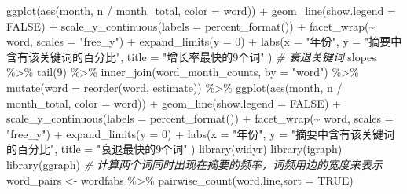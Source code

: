 \documentclass[]{tufte-book}
\newenvironment{Shaded}{}{}
\newcommand{\AttributeTok}[1]{\textcolor[rgb]{0.49,0.56,0.16}{#1}}
\newcommand{\CommentTok}[1]{\textcolor[rgb]{0.38,0.63,0.69}{\textit{#1}}}
\newcommand{\ConstantTok}[1]{\textcolor[rgb]{0.53,0.00,0.00}{#1}}
\newcommand{\DecValTok}[1]{\textcolor[rgb]{0.25,0.63,0.44}{#1}}
\newcommand{\FunctionTok}[1]{\textcolor[rgb]{0.02,0.16,0.49}{#1}}
\newcommand{\NormalTok}[1]{#1}
\newcommand{\OtherTok}[1]{\textcolor[rgb]{0.00,0.44,0.13}{#1}}
\newcommand{\SpecialCharTok}[1]{\textcolor[rgb]{0.25,0.44,0.63}{#1}}
\newcommand{\StringTok}[1]{\textcolor[rgb]{0.25,0.44,0.63}{#1}}
\begin{document}
\begin{Shaded}
\begin{Highlighting}[]
  \FunctionTok{ggplot}\NormalTok{(}\FunctionTok{aes}\NormalTok{(month, n }\SpecialCharTok{/}\NormalTok{ month\_total, }\AttributeTok{color =}\NormalTok{ word)) }\SpecialCharTok{+}
  \FunctionTok{geom\_line}\NormalTok{(}\AttributeTok{show.legend =} \ConstantTok{FALSE}\NormalTok{) }\SpecialCharTok{+}
  \FunctionTok{scale\_y\_continuous}\NormalTok{(}\AttributeTok{labels =} \FunctionTok{percent\_format}\NormalTok{()) }\SpecialCharTok{+}
  \FunctionTok{facet\_wrap}\NormalTok{(}\SpecialCharTok{\textasciitilde{}}\NormalTok{ word, }\AttributeTok{scales =} \StringTok{"free\_y"}\NormalTok{) }\SpecialCharTok{+}
  \FunctionTok{expand\_limits}\NormalTok{(}\AttributeTok{y =} \DecValTok{0}\NormalTok{) }\SpecialCharTok{+}
  \FunctionTok{labs}\NormalTok{(}\AttributeTok{x =} \StringTok{"年份"}\NormalTok{,}
       \AttributeTok{y =} \StringTok{"摘要中含有该关键词的百分比"}\NormalTok{,}
       \AttributeTok{title =} \StringTok{"增长率最快的9个词"}
\NormalTok{              )}
\CommentTok{\# 衰退关键词}
\NormalTok{slopes }\SpecialCharTok{\%\textgreater{}\%}
  \FunctionTok{tail}\NormalTok{(}\DecValTok{9}\NormalTok{) }\SpecialCharTok{\%\textgreater{}\%}
  \FunctionTok{inner\_join}\NormalTok{(word\_month\_counts, }\AttributeTok{by =} \StringTok{"word"}\NormalTok{) }\SpecialCharTok{\%\textgreater{}\%}
  \FunctionTok{mutate}\NormalTok{(}\AttributeTok{word =} \FunctionTok{reorder}\NormalTok{(word, estimate)) }\SpecialCharTok{\%\textgreater{}\%}
  \FunctionTok{ggplot}\NormalTok{(}\FunctionTok{aes}\NormalTok{(month, n }\SpecialCharTok{/}\NormalTok{ month\_total, }\AttributeTok{color =}\NormalTok{ word)) }\SpecialCharTok{+}
  \FunctionTok{geom\_line}\NormalTok{(}\AttributeTok{show.legend =} \ConstantTok{FALSE}\NormalTok{) }\SpecialCharTok{+}
  \FunctionTok{scale\_y\_continuous}\NormalTok{(}\AttributeTok{labels =} \FunctionTok{percent\_format}\NormalTok{()) }\SpecialCharTok{+}
  \FunctionTok{facet\_wrap}\NormalTok{(}\SpecialCharTok{\textasciitilde{}}\NormalTok{ word, }\AttributeTok{scales =} \StringTok{"free\_y"}\NormalTok{) }\SpecialCharTok{+}
  \FunctionTok{expand\_limits}\NormalTok{(}\AttributeTok{y =} \DecValTok{0}\NormalTok{) }\SpecialCharTok{+}
  \FunctionTok{labs}\NormalTok{(}\AttributeTok{x =} \StringTok{"年份"}\NormalTok{,}
       \AttributeTok{y =} \StringTok{"摘要中含有该关键词的百分比"}\NormalTok{,}
       \AttributeTok{title =} \StringTok{"衰退最快的9个词"}
\NormalTok{              )}
\FunctionTok{library}\NormalTok{(widyr)}
\FunctionTok{library}\NormalTok{(igraph)}
\FunctionTok{library}\NormalTok{(ggraph)}
\CommentTok{\# 计算两个词同时出现在摘要的频率，词频用边的宽度来表示}
\NormalTok{word\_pairs }\OtherTok{\textless{}{-}}\NormalTok{ wordfabs }\SpecialCharTok{\%\textgreater{}\%}
        \FunctionTok{pairwise\_count}\NormalTok{(word,line,}\AttributeTok{sort =} \ConstantTok{TRUE}\NormalTok{)}


\end{Highlighting}
\end{Shaded}
\end{document}
